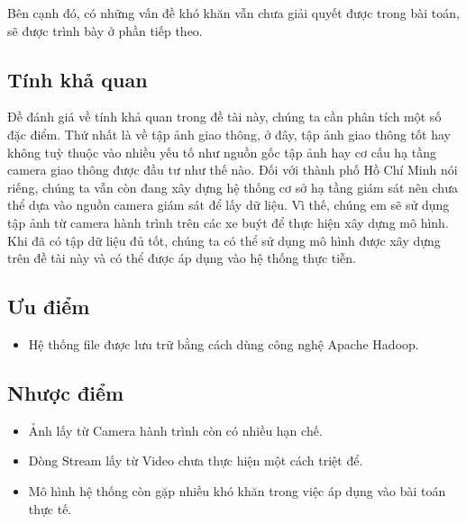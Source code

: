 	 Bên cạnh đó, có những vấn đề khó khăn vẫn chưa giải quyết được trong bài toán, sẽ được trình bày ở phần tiếp theo.\\

\subsection{Tính khả quan}
	Đề đánh giá về tính khả quan trong đề tài này, chúng ta cần phân tích một số đặc điểm. Thứ nhất là về tập ảnh giao thông, ở đây, tập ảnh giao thông tốt hay không tuỳ thuộc vào nhiều yếu tố như nguồn gốc tập ảnh hay cơ cấu hạ tầng camera giao thông được đầu tư như thế nào. Đối với thành phố Hồ Chí Minh nói riếng, chúng ta vẫn còn đang xây dựng hệ thống cơ sở hạ tầng giám sát nên chưa thể dựa vào nguồn camera giám sát để lấy dữ liệu. Vì thế, chúng em sẽ sử dụng tập ảnh từ camera hành trình trên các xe buýt để thực hiện xây dựng mô hình. Khi đã có tập dữ liệu đủ tốt, chúng ta có thể sử dụng mô hình được xây dựng trên đề tài này và có thể được áp dụng vào hệ thống thực tiễn.

\subsection{Ưu điểm}
	\begin{itemize}
		\item{Hệ thống file được lưu trữ bằng cách dùng công nghệ Apache Hadoop.}
	\end{itemize}
	
\subsection{Nhược điểm}
	\begin{itemize}
		\item{Ảnh lấy từ Camera hành trình còn có nhiều hạn chế.}
		\item{Dòng Stream lấy từ Video chưa thực hiện một cách triệt để.}
		\item{Mô hình hệ thống còn gặp nhiều khó khăn trong việc áp dụng vào bài toán thực tế.}
	\end{itemize}
	  
